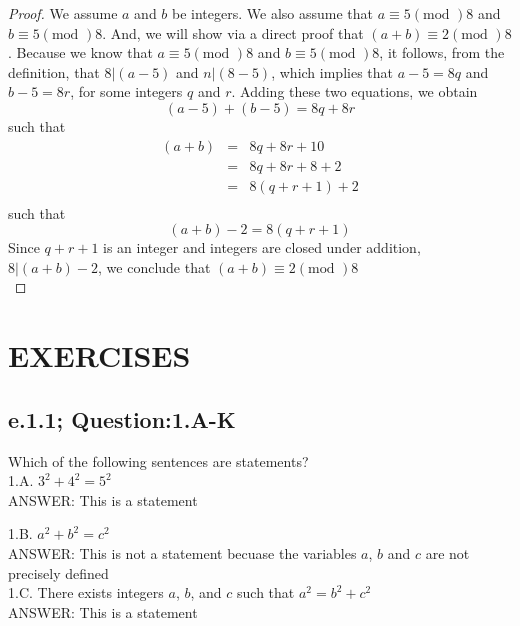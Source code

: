 \begin{proof}
We assume $a$ and $b$ be integers. We also assume that $a \equiv 5 (\text{mod })8$ and $b \equiv 5 (\text{mod })8$. And, we will show via a direct proof that $(a + b) \equiv 2 (\text{mod })8$. Because we know that $a \equiv 5 (\text{mod })8$ and $b \equiv 5 (\text{mod })8$, it follows, from the definition, that   $8 | (a-5)$ and $n | (8-5)$, which implies that $a-5 = 8q$ and $b-5 = 8r$, for some integers $q$ and $r$. Adding these two equations, we obtain \[ (a-5) + (b-5) = 8q + 8r \]such that
	\begin{eqnarray}
	(a+b)& = & 8q + 8r + 10 \nonumber \\
	& = & 8q + 8r + 8 + 2 \nonumber \\
	& = & 8(q + r + 1) + 2 \nonumber \\
	\end{eqnarray}	 
such that \[ (a+b) - 2 = 8(q + r + 1) \] 
Since $q + r + 1$ is an integer and integers are closed under addition, $8 | (a+b) - 2$, we conclude that $(a+b) \equiv 2 (\text{mod })8$ \\
\end{proof}





\newpage
\section{EXERCISES}


\subsection*{e.1.1; Question:1.A-K}

Which of the following sentences are statements? \\

1.A. $3^2 + 4^2 = 5^2$ \\
	ANSWER: This is a statement

1.B. $a^2 + b^2 = c^2 $ \\ 
	ANSWER: This is not a statement becuase the variables $a$, $b$ and $c$ are not precisely defined \\

1.C. There exists integers $a$, $b$, and $c$ such that $a^2 = b^2 + c^2$ \\
	ANSWER: This is a statement\\

